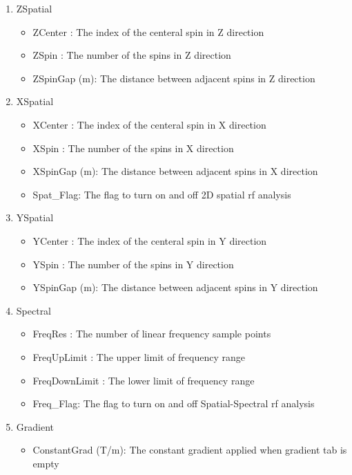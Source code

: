 \documentclass{book}%
\begin{document}
\begin{enumerate}
\begin{enumerate}
\item ZSpatial \label{it:ZSpatial}
\begin{itemize}
	\item ZCenter : The index of the centeral spin in Z direction
	\item ZSpin : The number of the spins in Z direction
	\item ZSpinGap (m): The distance between adjacent spins in Z direction
\end{itemize}

\item XSpatial \label{it:XSpatial}

\begin{itemize}
	\item XCenter : The index of the centeral spin in X direction
	\item XSpin : The number of the spins in X direction
	\item XSpinGap (m): The distance between adjacent spins in X direction
	\item Spat\_Flag: The flag to turn on and off 2D spatial rf analysis
\end{itemize}

\item YSpatial \label{it:YSpatial}

\begin{itemize}
	\item YCenter : The index of the centeral spin in Y direction
	\item YSpin : The number of the spins in Y direction
	\item YSpinGap (m): The distance between adjacent spins in Y direction
\end{itemize}

\item Spectral \label{it:Spectral}

\begin{itemize}
	\item FreqRes : The number of linear frequency sample points
	\item FreqUpLimit : The upper limit of frequency range
	\item FreqDownLimit : The lower limit of frequency range
	\item Freq\_Flag: The flag to turn on and off Spatial-Spectral rf analysis
\end{itemize}

\item Gradient

\begin{itemize}
	\item ConstantGrad (T/m): The constant gradient applied when gradient tab is empty
\end{itemize}


\end{enumerate}
\end{enumerate}
\end{document}

